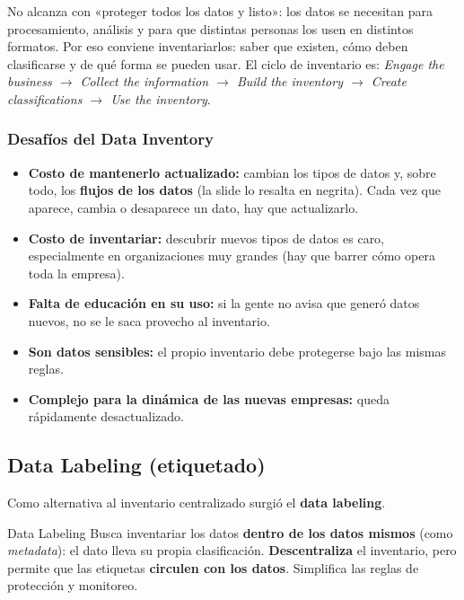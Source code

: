 \documentclass[11pt,a4paper]{article}
\begin{document}
No alcanza con «proteger todos los datos y listo»: los datos se necesitan para procesamiento,
análisis y para que distintas personas los usen en distintos formatos. Por eso conviene
inventariarlos: saber que existen, cómo deben clasificarse y de qué forma se pueden usar. El
ciclo de inventario es: \emph{Engage the business $\to$ Collect the information $\to$ Build the
inventory $\to$ Create classifications $\to$ Use the inventory}.

\subsubsection*{Desafíos del Data Inventory}

\begin{itemize}[leftmargin=1.4em,itemsep=2pt]
  \item \textbf{Costo de mantenerlo actualizado:} cambian los tipos de datos y, sobre todo,
        los \textbf{flujos de los datos} (la slide lo resalta en negrita). Cada vez que aparece,
        cambia o desaparece un dato, hay que actualizarlo.
  \item \textbf{Costo de inventariar:} descubrir nuevos tipos de datos es caro, especialmente
        en organizaciones muy grandes (hay que barrer cómo opera toda la empresa).
  \item \textbf{Falta de educación en su uso:} si la gente no avisa que generó datos nuevos,
        no se le saca provecho al inventario.
  \item \textbf{Son datos sensibles:} el propio inventario debe protegerse bajo las mismas
        reglas.
  \item \textbf{Complejo para la dinámica de las nuevas empresas:} queda rápidamente
        desactualizado.
\end{itemize}

\subsection{Data Labeling (etiquetado)}

Como alternativa al inventario centralizado surgió el \textbf{data labeling}.

\begin{defbox}{Data Labeling}
Busca inventariar los datos \textbf{dentro de los datos mismos} (como \emph{metadata}):
el dato lleva su propia clasificación. \textbf{Descentraliza} el inventario, pero permite que
las etiquetas \textbf{circulen con los datos}. Simplifica las reglas de protección y monitoreo.
\end{defbox}
\end{document}
